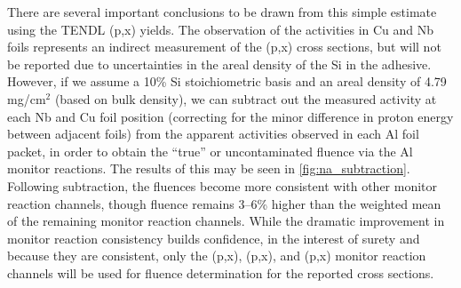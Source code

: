 There are several important  conclusions to be drawn from this simple estimate using the TENDL   (p,x) yields.
The observation of the  activities in Cu and Nb foils  represents an indirect measurement of the (p,x) cross sections, but  will not be reported due to 
uncertainties in the areal density of the Si in the adhesive.
However, if we assume a 10\% Si stoichiometric basis and an areal density of 4.79\,mg/cm$^2$ (based on bulk density),
we can subtract out the measured  activity at each Nb and Cu foil position (correcting for the minor difference in proton energy between adjacent foils) from the apparent   activities observed in each Al foil packet, in order to obtain the \enquote{true} or uncontaminated fluence via the Al monitor reactions.
The results of this  may be seen in \autoref{fig:na_subtraction}.
Following subtraction, the  fluences become more consistent with other monitor reaction channels, 
though   fluence remains 3--6\% higher than the weighted mean of the remaining monitor reaction channels.
While the dramatic improvement in monitor reaction consistency builds confidence, in the interest of surety and because they are consistent, only the (p,x), (p,x), and (p,x) monitor reaction channels will be used for fluence determination for the reported cross sections.
